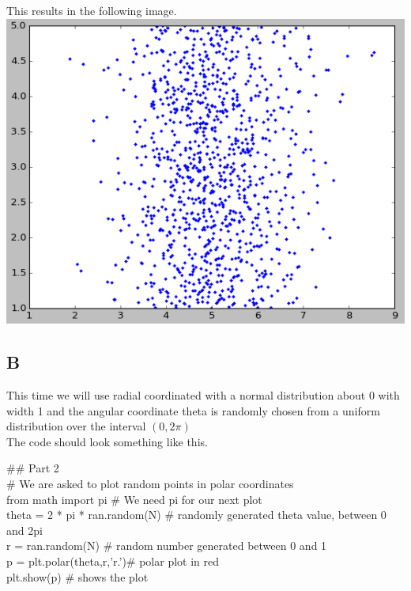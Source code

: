 \documentclass[11pt]{article}   %
\begin{document}
This results in the following image.\\
\includegraphics[scale=0.75]{Hw1Fig1.png}


\subsection*{B}
This time we will use radial coordinated with a normal distribution about 0 with width 1 and the angular coordinate theta is randomly chosen from a uniform distribution over the interval $(0,2\pi)$
\\
The code should look something like this.

\begin{tcolorbox}
   
      $\#\#$ Part 2\\
      $\#$ We are asked to plot random points in polar coordinates\\ 
      from math import pi        $\#$ We need pi for our next plot\\
      theta = 2 * pi * ran.random(N)   $\#$ randomly generated theta value, between 0 and 2pi\\
      r = ran.random(N)          $\#$ random number generated between 0 and 1\\
      p = plt.polar(theta,r,'r.')$\#$ polar plot in red\\
      plt.show(p)                $\#$ shows the plot
   
\end{tcolorbox}
\end{document}
